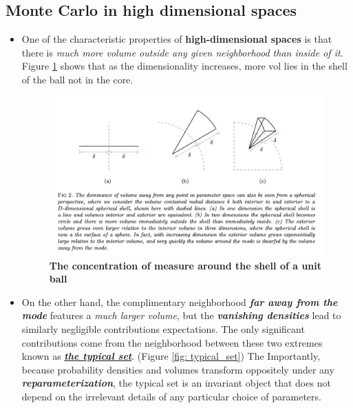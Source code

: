\documentclass[11pt]{article}
\begin{document}
\subsection{Monte Carlo in high dimensional spaces}
\begin{itemize}
\item One of the characteristic properties of \textbf{high-dimensional spaces} is that there is \emph{much more volume outside any given neighborhood than inside of it}. Figure \ref{fig: concentration_measure_ball} shows that as the dimensionality increases, more vol lies in the shell of the ball not in the core. 

\begin{figure}
\begin{minipage}[t]{1\linewidth}
  \centering
  \centerline{\includegraphics[scale = 0.5]{concentration_measure_ball.png}}
\end{minipage}
\caption{\footnotesize{\textbf{The concentration of measure around the shell of a unit ball \citep{betancourt2017conceptual}}}}
\label{fig: concentration_measure_ball}
\end{figure}

\item On the other hand, the complimentary neighborhood \emph{\textbf{far away from the mode}} features a \emph{much larger volume}, but the \emph{\textbf{vanishing densities}} lead to similarly negligible contributions expectations.  The only significant contributions come from the neighborhood between these two extremes known as \underline{\emph{\textbf{the typical set}}}. (Figure \ref{fig: typical_set}) The Importantly, because probability densities and volumes transform oppositely under any \emph{\textbf{reparameterization}}, the typical set is an invariant object that does not depend on the irrelevant details of any particular choice of parameters. %


\end{itemize}
\end{document}
